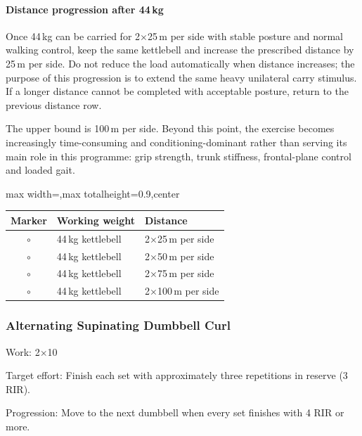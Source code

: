 \documentclass[11pt,a4paper]{article}
\newcommand{\tablearraystretch}{1.15}
\begin{document}
\paragraph{Distance progression after 44\,kg}

Once 44\,kg can be carried for 2$\times$25\,m per side with stable posture and normal walking control, keep the same kettlebell and increase the prescribed distance by 25\,m per side. Do not reduce the load automatically when distance increases; the purpose of this progression is to extend the same heavy unilateral carry stimulus. If a longer distance cannot be completed with acceptable posture, return to the previous distance row.

The upper bound is 100\,m per side. Beyond this point, the exercise becomes increasingly time-consuming and conditioning-dominant rather than serving its main role in this programme: grip strength, trunk stiffness, frontal-plane control and loaded gait.

\begin{center}
\renewcommand{\arraystretch}{\tablearraystretch}
\begin{adjustbox}{max width=\linewidth,max totalheight=0.9\textheight,center}
\begin{tabular}{cll}
\toprule
Marker & Working weight & Distance \\
\midrule
$\circ$ & 44\,kg kettlebell & 2$\times$25\,m per side \\
$\circ$ & 44\,kg kettlebell & 2$\times$50\,m per side \\
$\circ$ & 44\,kg kettlebell & 2$\times$75\,m per side \\
$\circ$ & 44\,kg kettlebell & 2$\times$100\,m per side \\
\bottomrule
\end{tabular}
\end{adjustbox}
\renewcommand{\arraystretch}{1}
\end{center}

\newpage
\subsubsection{Alternating Supinating Dumbbell Curl}

Work: 2$\times$10

Target effort: Finish each set with approximately three repetitions in reserve (3 RIR).

Progression: Move to the next dumbbell when every set finishes with 4 RIR or more.
\end{document}

